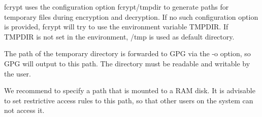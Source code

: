 {\ttfamily fcrypt} uses the configuration option {\ttfamily fcrypt/tmpdir} to generate paths for temporary files during encryption and decryption. If no such configuration option is provided, {\ttfamily fcrypt} will try to use the environment variable {\ttfamily T\+M\+P\+D\+IR}. If {\ttfamily T\+M\+P\+D\+IR} is not set in the environment, {\ttfamily /tmp} is used as default directory.

The path of the temporary directory is forwarded to G\+PG via the {\ttfamily -\/o} option, so G\+PG will output to this path. The directory must be readable and writable by the user.

We recommend to specify a path that is mounted to a R\+AM disk. It is advisable to set restrictive access rules to this path, so that other users on the system can not access it. 